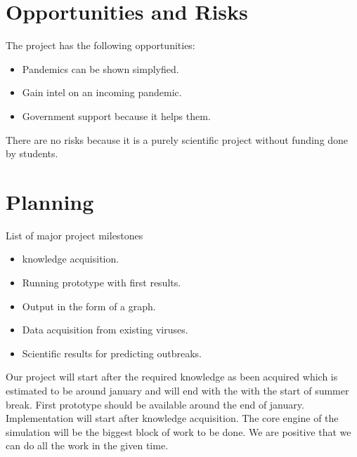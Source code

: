 \documentclass[12pt]{article}
\theoremstyle{definition}
\begin{document}
\section{Opportunities and Risks}

The project has the following opportunities:
\begin{itemize}
\item Pandemics can be shown simplyfied.
\item Gain intel on an incoming pandemic.
\item Government support because it helps them.
\end{itemize}

There are no risks because it is a purely scientific project without funding done by students.

\pagebreak
\section{Planning}

List of major project milestones
\begin{itemize}
\item knowledge acquisition.
\item Running prototype with first results.
\item Output in the form of a graph.
\item Data acquisition from existing viruses.
\item Scientific results for predicting outbreaks.
\end{itemize}

Our project will start after the required knowledge as been acquired which is estimated to be around january and will end with the with the start of summer break.
First prototype should be available around the end of january.
Implementation will start after knowledge acquisition.
The core engine of the simulation will be the biggest block of work to be done.
We are positive that we can do all the work in the given time.
\end{document}
